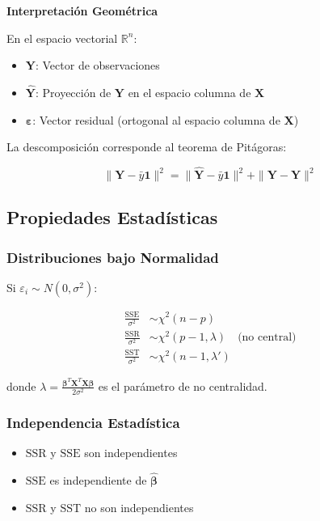\documentclass[12pt]{article}
\begin{document}
\textbf{Interpretación Geométrica}

En el espacio vectorial $\mathbb{R}^n$:

\begin{itemize}
\item $\mathbf{Y}$: Vector de observaciones
\item $\mathbf{\hat{Y}}$: Proyección de $\mathbf{Y}$ en el espacio columna de $\mathbf{X}$
\item $\boldsymbol{\varepsilon}$: Vector residual (ortogonal al espacio columna de $\mathbf{X}$)
\end{itemize}

La descomposición corresponde al teorema de Pitágoras:

\[
\|\mathbf{Y} - \bar{y}\mathbf{1}\|^2 = \|\mathbf{\hat{Y}} - \bar{y}\mathbf{1}\|^2 + \|\mathbf{Y} - \mathbf{\hat{Y}}\|^2
\]

\subsection{Propiedades Estadísticas}

\subsubsection{Distribuciones bajo Normalidad}

Si $\varepsilon_i \sim N(0, \sigma^2)$:

\begin{align*}
\frac{\text{SSE}}{\sigma^2} &\sim \chi^2(n-p) \\
\frac{\text{SSR}}{\sigma^2} &\sim \chi^2(p-1, \lambda) \quad \text{(no central)} \\
\frac{\text{SST}}{\sigma^2} &\sim \chi^2(n-1, \lambda')
\end{align*}

donde $\lambda = \frac{\boldsymbol{\beta}^T\mathbf{X}^T\mathbf{X}\boldsymbol{\beta}}{2\sigma^2}$ es el parámetro de no centralidad.

\subsubsection{Independencia Estadística}

\begin{itemize}
\item $\text{SSR}$ y $\text{SSE}$ son independientes
\item $\text{SSE}$ es independiente de $\hat{\boldsymbol{\beta}}$
\item $\text{SSR}$ y $\text{SST}$ no son independientes
\end{itemize}
\end{document}
